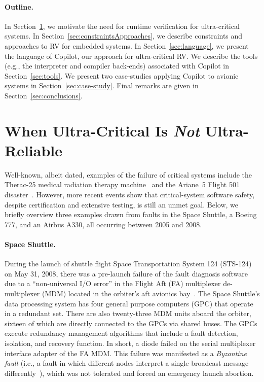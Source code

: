 \paragraph{Outline.}  In Section~\ref{sec:motivation}, we motivate the need for
runtime verification for ultra-critical systems.  In
Section~\ref{sec:constraintsApproaches}, we describe constraints and approaches to RV for
embedded systems.  In
Section~\ref{sec:language}, we present the language of Copilot, our approach for
ultra-critical RV.  We describe the tools (e.g., the interpreter and compiler
back-ends) associated with Copilot in Section~\ref{sec:tools}.  We present two
case-studies applying Copilot to avionic systems in
Section~\ref{sec:case-study}.  Final remarks are given in Section~\ref{sec:conclusions}.

\section{When Ultra-Critical Is \emph{Not} Ultra-Reliable}\label{sec:motivation}

Well-known, albeit dated, examples of the failure of critical systems include the
Therac-25 medical radiation therapy machine~\cite{therac} and the Ariane~5
Flight 501 disaster~\cite{ariane}.  However, more recent events show that
critical-system software safety, despite certification and extensive testing, is still an
unmet goal.  Below, we briefly overview three examples drawn from
faults in the Space Shuttle, a Boeing 777, and an Airbus A330, all occurring
between 2005 and 2008.

\paragraph{Space Shuttle.}
During the launch of shuttle flight Space Transportation System 124 (STS-124) on
May 31, 2008, there was a pre-launch failure of the fault diagnosis software due
to a ``non-universal I/O error'' in the Flight Aft (FA) multiplexer
de-multiplexer (MDM) located in the orbiter's aft avionics bay~\cite{mdm08}.
The Space Shuttle's data processing system has four general purpose computers
(GPC) that operate in a redundant set.  There are also twenty-three MDM units
aboard the orbiter, sixteen of which are directly connected to the GPCs via
shared buses.  The GPCs execute redundancy management algorithms that include a
fault detection, isolation, and recovery function.  In short, a diode failed on
the serial multiplexer interface adapter of the FA MDM.  This failure was
manifested as a \emph{Byzantine fault} (i.e., a fault in which different nodes
interpret a single broadcast message differently~\cite{lamport95byzantine}), which was not
tolerated and forced an emergency launch abortion.



